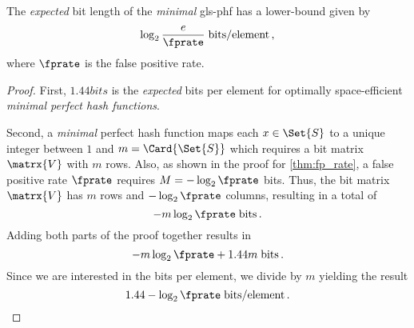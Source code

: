 \documentclass[ ../main.tex]{subfiles}
\begin{document}
\begin{corollary}
The \emph{expected} bit length of the \emph{minimal} \gls{gls-phf} has a lower-bound given by
\begin{equation}
\label{eq:mPHF_size}
    \log_2 \frac{e}{\fprate} \; \si{bits \per element}\,,
\end{equation}
where $\fprate$ is the false positive rate.
\end{corollary}
\begin{proof}
First, $1.44 \si{bits}$ is the \emph{expected} bits per element for optimally space-efficient \emph{minimal perfect hash functions}.

Second, a \emph{minimal} perfect hash function maps each $x \in \Set{S}$ to a unique integer between $1$ and $m=\Card{\Set{S}}$ which requires a bit matrix $\matrx{V}$ with $m$ rows. Also, as shown in the proof for \cref{thm:fp_rate}, a false positive rate $\fprate$ requires $M = -\log_2 \fprate$ bits. Thus, the bit matrix $\matrx{V}$ has $m$ rows and $-\log_2 \fprate$ columns, resulting in a total of
\begin{equation}
    -m \log_2 \fprate \; \si{bits}\,.
\end{equation}
Adding both parts of the proof together results in
\begin{equation}
    -m \log_2 \fprate + 1.44 m\; \si{bits}\,.
\end{equation}
Since we are interested in the bits per element, we divide by $m$ yielding the result
\begin{equation}
    1.44 - \log_2 \fprate\; \si{bits \per element}\,.
\end{equation}
\end{proof}
\end{document}

